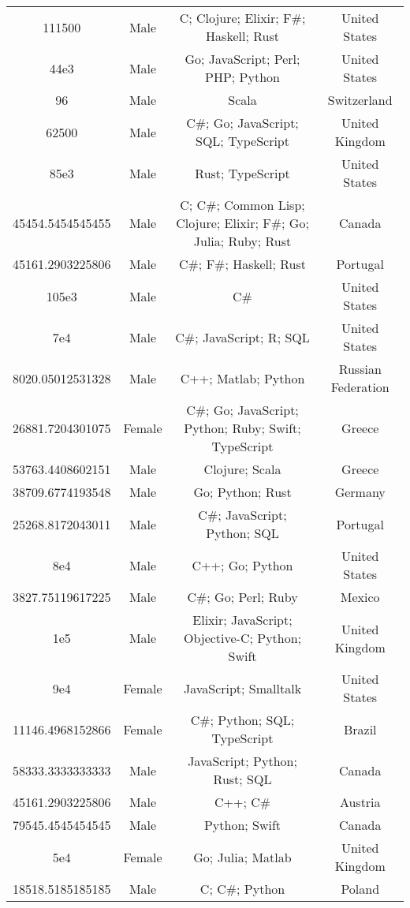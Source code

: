 \begin{center}
\begin{tabular}{ |c|c|c|c| }
111500  &  Male  &  C; Clojure; Elixir; F\#; Haskell; Rust  &  United States  \\ 
44e3  &  Male  &  Go; JavaScript; Perl; PHP; Python  &  United States  \\ 
96  &  Male  &  Scala  &  Switzerland  \\ 
62500  &  Male  &  C\#; Go; JavaScript; SQL; TypeScript  &  United Kingdom  \\ 
85e3  &  Male  &  Rust; TypeScript  &  United States  \\ 
45454.5454545455  &  Male  &  C; C\#; Common Lisp; Clojure; Elixir; F\#; Go; Julia; Ruby; Rust  &  Canada  \\ 
45161.2903225806  &  Male  &  C\#; F\#; Haskell; Rust  &  Portugal  \\ 
105e3  &  Male  &  C\#  &  United States  \\ 
7e4  &  Male  &  C\#; JavaScript; R; SQL  &  United States  \\ 
8020.05012531328  &  Male  &  C++; Matlab; Python  &  Russian Federation  \\ 
26881.7204301075  &  Female  &  C\#; Go; JavaScript; Python; Ruby; Swift; TypeScript  &  Greece  \\ 
53763.4408602151  &  Male  &  Clojure; Scala  &  Greece  \\ 
38709.6774193548  &  Male  &  Go; Python; Rust  &  Germany  \\ 
25268.8172043011  &  Male  &  C\#; JavaScript; Python; SQL  &  Portugal  \\ 
8e4  &  Male  &  C++; Go; Python  &  United States  \\ 
3827.75119617225  &  Male  &  C\#; Go; Perl; Ruby  &  Mexico  \\ 
1e5  &  Male  &  Elixir; JavaScript; Objective-C; Python; Swift  &  United Kingdom  \\ 
9e4  &  Female  &  JavaScript; Smalltalk  &  United States  \\ 
11146.4968152866  &  Female  &  C\#; Python; SQL; TypeScript  &  Brazil  \\ 
58333.3333333333  &  Male  &  JavaScript; Python; Rust; SQL  &  Canada  \\ 
45161.2903225806  &  Male  &  C++; C\#  &  Austria  \\ 
79545.4545454545  &  Male  &  Python; Swift  &  Canada  \\ 
5e4  &  Female  &  Go; Julia; Matlab  &  United Kingdom  \\ 
18518.5185185185  &  Male  &  C; C\#; Python  &  Poland  \\ 

\end{tabular}
\end{center}

